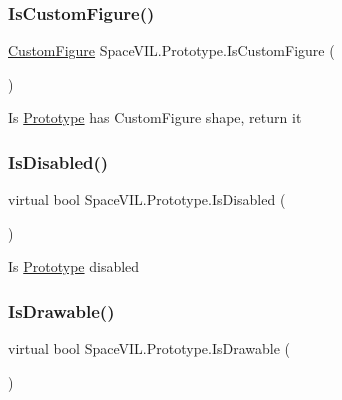 \subsubsection{\texorpdfstring{Is\+Custom\+Figure()}{IsCustomFigure()}}
{\footnotesize\ttfamily \mbox{\hyperlink{class_space_v_i_l_1_1_decorations_1_1_custom_figure}{Custom\+Figure}} Space\+V\+I\+L.\+Prototype.\+Is\+Custom\+Figure (\begin{DoxyParamCaption}{ }\end{DoxyParamCaption})}



Is \mbox{\hyperlink{class_space_v_i_l_1_1_prototype}{Prototype}} has Custom\+Figure shape, return it ~\newline


\mbox{\label{class_space_v_i_l_1_1_prototype_acfe05e01f98da47801861ce5cc03640a}} 
\subsubsection{\texorpdfstring{Is\+Disabled()}{IsDisabled()}}
{\footnotesize\ttfamily virtual bool Space\+V\+I\+L.\+Prototype.\+Is\+Disabled (\begin{DoxyParamCaption}{ }\end{DoxyParamCaption})\hspace{0.3cm}{\ttfamily [virtual]}}



Is \mbox{\hyperlink{class_space_v_i_l_1_1_prototype}{Prototype}} disabled 

\mbox{\label{class_space_v_i_l_1_1_prototype_a5e0af4f19ec991534e4cb5fdbe876af2}} 
\subsubsection{\texorpdfstring{Is\+Drawable()}{IsDrawable()}}
{\footnotesize\ttfamily virtual bool Space\+V\+I\+L.\+Prototype.\+Is\+Drawable (\begin{DoxyParamCaption}{ }\end{DoxyParamCaption})\hspace{0.3cm}{\ttfamily [virtual]}}




